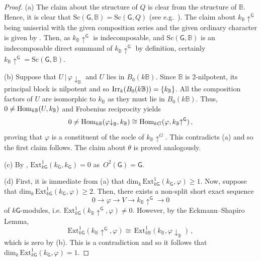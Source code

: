 \documentclass[12pt,a4paper]{amsart}
\theoremstyle{plain}\newtheorem{Theorem}{Theorem}[section]
\theoremstyle{plain}\newtheorem{Conjecture}[Theorem]{Conjecture}
\theoremstyle{plain}\newtheorem{Corollary}[Theorem]{Corollary}
\theoremstyle{plain}\newtheorem{Lemma}[Theorem]{Lemma}
\theoremstyle{plain}\newtheorem{Proposition}[Theorem]{Proposition}
\theoremstyle{definition}\newtheorem{Definition}[Theorem]{Definition}
\theoremstyle{definition}\newtheorem{Example}[Theorem]{Example}
\theoremstyle{definition}\newtheorem{Examples}[Theorem]{Examples}
\theoremstyle{definition}\newtheorem{Remark}[Theorem]{Remark}
\theoremstyle{definition}\newtheorem{Question}[Theorem]{Question}
\theoremstyle{definition}\newtheorem{Notation}[Theorem]{Notation}
\theoremstyle{definition}\newtheorem{Hypothesis}[Theorem]{Hypothesis}
\theoremstyle{definition}\newtheorem{Assumption}[Theorem]{Assumption}
\theoremstyle{definition}\newtheorem{Strategy}[Theorem]{Strategy}
\theoremstyle{definition}\newtheorem{Contents}[Theorem]{Contents}
\theoremstyle{definition}\newtheorem{Computations}[Theorem]{Computations}
\theoremstyle{definition}\newtheorem{Equivalences}[Theorem]{Equivalences}
\theoremstyle{definition}\newtheorem{Notation/Definition}[Theorem]{Notation/Definition}
\theoremstyle{definition}\newtheorem{noth}[Theorem]{}
\theoremstyle{plain}\newtheorem{Step}[Theorem]{Step}
\def\dim{\mathrm{dim}}
\def\Ext{\mathrm{Ext}}
\begin{document}
\begin{proof} 
(a) The claim about the structure of $Q$ is clear from the structure of $\mathbb{B}$. 
Hence, it is clear that $\mathrm{Sc}(\mathsf{G},\mathbb B) = \mathrm{Sc}(\mathsf{G}, Q)$  
(see e.g.~\cite[Corollary 4.8.5]{NT89}).
The claim about $k_{\mathbb B}{\uparrow}^\mathsf{G}$ being uniserial with the given composition series 
and the given ordinary character is given by  \cite[Theorem 4.1(c) and Appendix (pp. 238--241)]{His04}.
Then, as $k_{\mathbb B}{\uparrow}^\mathsf{G}$ is indecomposable, and 
${\mathrm{Sc}}(\mathsf{G},\mathbb B)$ 
is an indecomposable direct summand of $k_{\mathbb B}{\uparrow}^\mathsf{G}$ by definition, certainly 
\smallskip $k_{\mathbb B}{\uparrow}^\mathsf{G}={\mathrm{Sc}}(\mathsf{G},\mathbb B)$. 
\par
(b) Suppose that $U\,|\,\varphi{\downarrow}_{\mathbb B}$ and $U$ lies in $B_0(k\mathbb B)$.
Since $\mathbb B$ is $2$-nilpotent, its principal block is nilpotent and so 
$\mathrm{Irr}_{k}(B_0(k\mathbb B))=\{k_{\mathbb{B}}\}$.
All the composition factors of $U$ are isomorphic to $k_{\mathbb{B}}$ as they must lie in $B_0(k\mathbb B)$. 
Thus, $0\neq \mathrm{Hom}_{k\mathbb B}(U,k_{\mathbb B})$ and Frobenius reciprocity yields
$$0\neq \mathrm{Hom}_{k\mathbb B}(\varphi{\downarrow}_{\mathbb B}, k_{\mathbb B})
\cong \mathrm{Hom}_{kG}(\varphi, k_{\mathbb B}{\uparrow}^\mathsf{G})\,,$$
proving that $\varphi$ is a constituent of the socle of  $k_{\mathbb B}{\uparrow}^G$. 
This contradicts (a) and so the first claim follows. 
The claim about $\theta$ is proved \smallskip analogously. 
\par
(c) By \cite[I Corollary 10.13]{Lan83}, $\Ext_{k\mathsf{G}}^1(k_\mathsf{G}, k_\mathsf{G})=0$ 
\smallskip as~$O^2(\mathsf{G})=\mathsf{G}$.
\par
(d) First, it is immediate from (a) that $\dim_k\,\Ext_{k\mathsf{G}}^1(k_\mathsf{G},\varphi)\geq 1$. 
Now, suppose that $\dim_k\,\Ext_{k\mathsf{G}}^1(k_\mathsf{G},\varphi)\geq 2$. 
Then, 
there exists a non-split short exact sequence
$$0\rightarrow\varphi\rightarrow V\rightarrow k_{\mathbb B}{\uparrow}^\mathsf{G}\rightarrow 0$$
of $k\mathsf{G}$-modules, i.e. $\Ext_{k\mathsf{G}}^1(k_{\mathbb B}{\uparrow}^\mathsf{G},\varphi)\neq 0$. 
However, by the Eckmann--Shapiro Lemma, 
$$\Ext_{k\mathsf{G}}^1(k_{\mathbb B}{\uparrow}^\mathsf{G},\varphi)\cong
 \,\Ext_{k\mathbb B}^1(k_{\mathbb B},\varphi{\downarrow}_{\mathbb B})\,,$$ 
 which is zero by (b).  This is a contradiction and so it follows that 
 $\dim_k\,\Ext_{k\mathsf{G}}^1(k_\mathsf{G},\varphi)=1$. 

\end{proof}
\end{document}
